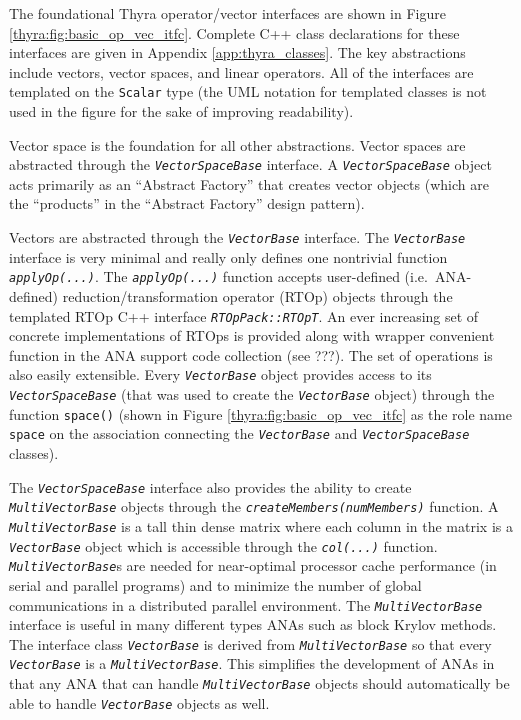 \documentclass[pdf,ps2pdf,11pt]{SANDreport}
\begin{document}
The foundational Thyra operator/vector interfaces are shown in Figure
{}\ref{thyra:fig:basic_op_vec_itfc}.  Complete C++ class declarations for
these interfaces are given in Appendix {}\ref{app:thyra_classes}.  The key
abstractions include vectors, vector spaces, and linear operators.  All of the
interfaces are templated on the {}\texttt{Scalar} type (the UML notation for
templated classes is not used in the figure for the sake of improving
readability).

Vector space is the foundation for all other abstractions.  Vector spaces are
abstracted through the {}\texttt{\textit{Vector\-Space\-Base}} interface.  A
{}\texttt{\textit{Vector\-Space\-Base}} object acts primarily as an ``Abstract
Factory'' {}\cite{ref:gama_et_al_1995} that creates vector objects (which are
the ``products'' in the ``Abstract Factory'' design pattern).

Vectors are abstracted through the {}\texttt{\textit{Vector\-Base}} interface.
The {}\texttt{\textit{Vector\-Base}} interface is very minimal and really only
defines one nontrivial function {}\texttt{\textit{applyOp(\-...)}}.  The
{}\texttt{\textit{applyOp(\-...)}} function accepts user-defined
(i.e.~ANA-defined) reduction/transformation operator (RTOp) objects through
the templated RTOp C++ interface {}\texttt{\textit{RTOpPack::RTOpT}}.  An ever
increasing set of concrete implementations of RTOps is provided along with
wrapper convenient function in the ANA support code collection (see ???).  The
set of operations is also easily extensible.  Every
{}\texttt{\textit{Vector\-Base}} object provides access to its
{}\texttt{\textit{Vector\-Space\-Base}} (that was used to create the
{}\texttt{\textit{Vector\-Base}} object) through the function
{}\texttt{space()} (shown in Figure {}\ref{thyra:fig:basic_op_vec_itfc} as the
role name {}\texttt{space} on the association connecting the
{}\texttt{\textit{Vector\-Base}} and {}\texttt{\textit{Vector\-Space\-Base}}
classes).

The {}\texttt{\textit{Vector\-Space\-Base}} interface also provides the
ability to create {}\texttt{\textit{Multi\-Vector\-Base}} objects through the
{}\texttt{\textit{createMembers(numMembers)}} function.  A
{}\texttt{\textit{Multi\-Vector\-Base}} is a tall thin dense matrix where each
column in the matrix is a {}\texttt{\textit{Vector\-Base}} object which is
accessible through the {}\texttt{\textit{col(...)}} function.
{}\texttt{\textit{Multi\-Vector\-Base}}s are needed for near-optimal processor
cache performance (in serial and parallel programs) and to minimize the number
of global communications in a distributed parallel environment.  The
{}\texttt{\textit{Multi\-Vector\-Base}} interface is useful in many different
types ANAs such as block Krylov methods.  The interface class
{}\texttt{\textit{Vector\-Base}} is derived from
{}\texttt{\textit{Multi\-Vector\-Base}} so that every
{}\texttt{\textit{Vector\-Base}} is a {}\texttt{\textit{Multi\-Vector\-Base}}.
This simplifies the development of ANAs in that any ANA that can handle
{}\texttt{\textit{Multi\-Vector\-Base}} objects should automatically be able
to handle {}\texttt{\textit{Vector\-Base}} objects as well.
\end{document}
